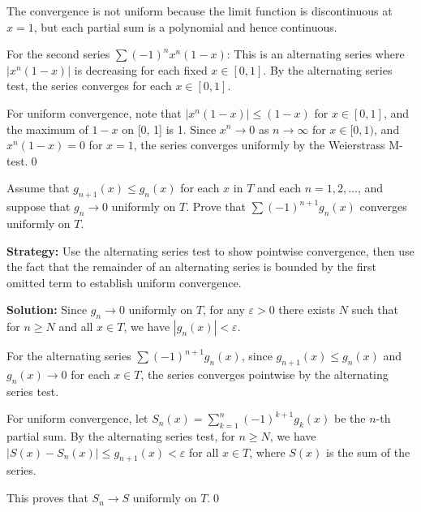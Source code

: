 The convergence is not uniform because the limit function is discontinuous at \( x = 1 \), but each partial sum is a polynomial and hence continuous.

For the second series \( \sum (-1)^n x^n (1 - x) \): This is an alternating series where \( |x^n (1 - x)| \) is decreasing for each fixed \( x \in [0, 1] \). By the alternating series test, the series converges for each \( x \in [0, 1] \).

For uniform convergence, note that \( |x^n (1 - x)| \leq (1 - x) \) for \( x \in [0, 1] \), and the maximum of \( 1 - x \) on [0, 1] is 1. Since \( x^n \to 0 \) as \( n \to \infty \) for \( x \in [0, 1) \), and \( x^n (1 - x) = 0 \) for \( x = 1 \), the series converges uniformly by the Weierstrass M-test.\qed


\begin{problembox}
\begin{problemstatement}
Assume that \( g_{n+1}(x) \leq g_n(x) \) for each \( x \) in \( T \) and each \( n = 1, 2, \ldots \), and suppose that \( g_n \to 0 \) uniformly on \( T \). Prove that \( \sum (-1)^{n+1} g_n(x) \) converges uniformly on \( T \).
\end{problemstatement}
\end{problembox}

\noindent\textbf{Strategy:} Use the alternating series test to show pointwise convergence, then use the fact that the remainder of an alternating series is bounded by the first omitted term to establish uniform convergence.

\bigskip\noindent\textbf{Solution:} Since \( g_n \to 0 \) uniformly on \( T \), for any \( \varepsilon > 0 \) there exists \( N \) such that for \( n \geq N \) and all \( x \in T \), we have \( |g_n(x)| < \varepsilon \).

For the alternating series \( \sum (-1)^{n+1} g_n(x) \), since \( g_{n+1}(x) \leq g_n(x) \) and \( g_n(x) \to 0 \) for each \( x \in T \), the series converges pointwise by the alternating series test.

For uniform convergence, let \( S_n(x) = \sum_{k=1}^n (-1)^{k+1} g_k(x) \) be the \( n \)-th partial sum. By the alternating series test, for \( n \geq N \), we have \( |S(x) - S_n(x)| \leq g_{n+1}(x) < \varepsilon \) for all \( x \in T \), where \( S(x) \) is the sum of the series.

This proves that \( S_n \to S \) uniformly on \( T \).\qed




